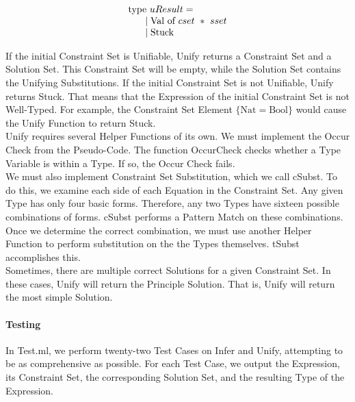 \documentclass{article}
\begin{document}
\begin{equation}
    \begin{array}{l}
    \text{type} \ uResult = \\
    \indent \mid \text{Val of} \ cset \ * \ sset \\
    \indent \mid \text{Stuck}
    \end{array}
\end{equation}

If the initial Constraint Set is Unifiable, Unify returns a Constraint Set and a Solution Set. This Constraint Set will be empty, while the Solution Set contains the Unifying Substitutions. If the initial Constraint Set is not Unifiable, Unify returns Stuck. That means that the Expression of the initial Constraint Set is not Well-Typed. For example, the Constraint Set Element $\{\text{Nat} = \text{Bool}\}$ would cause the Unify Function to return Stuck. \\

Unify requires several Helper Functions of its own. We must implement the Occur Check from the Pseudo-Code. The function OccurCheck checks whether a Type Variable is within a Type. If so, the Occur Check fails.\\

We must also implement Constraint Set Substitution, which we call cSubst. To do this, we examine each side of each Equation in the Constraint Set. Any given Type has only four basic forms. Therefore, any two Types have sixteen possible combinations of forms. cSubst performs a Pattern Match on these combinations. Once we determine the correct combination, we must use another Helper Function to perform substitution on the the Types themselves. tSubst accomplishes this. \\

Sometimes, there are multiple correct Solutions for a given Constraint Set. In these cases, Unify will return the Principle Solution. That is, Unify will return the most simple Solution.

\paragraph{Testing}

In Test.ml, we perform twenty-two Test Cases on Infer and Unify, attempting to be as comprehensive as possible. For each Test Case, we output the Expression, its Constraint Set, the corresponding Solution Set, and the resulting Type of the Expression. \\
\end{document}
